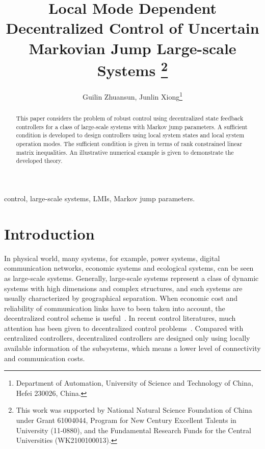 \documentclass[11pt,draftcls,onecolumn]{IEEEtran}
\begin{document}
\title{Local Mode Dependent Decentralized  Control of Uncertain Markovian Jump Large-scale Systems \thanks{This work was supported by National Natural Science Foundation
    of China under Grant 61004044, Program for New Century Excellent Talents
    in University (11-0880), and the Fundamental Research Funds for the
    Central Universities (WK2100100013).}
}
\author{Guilin Zhuansun, Junlin Xiong\thanks{Department of Automation, University of Science and Technology of
    China, Hefei 230026, China.}}



\maketitle

\begin{abstract}
This paper considers the problem of robust   control using decentralized state feedback controllers for a class of  large-scale systems with Markov jump parameters.  A  sufficient condition is developed to design   controllers using local system states and local system operation modes. The sufficient condition is given in terms of rank constrained linear matrix inequalities. An illustrative numerical example is given to demonstrate the developed theory.
\end{abstract}
\begin{IEEEkeywords}
 control, large-scale systems, LMIs, Markov jump parameters.
\end{IEEEkeywords}

\section{Introduction}
In physical world, many systems, for example, power systems, digital communication networks, economic systems and ecological systems, can be seen as large-scale systems. Generally, large-scale systems represent a class of
dynamic systems with high dimensions and complex structures, and such systems are usually  characterized by geographical separation. When economic cost and reliability of  communication links have to been taken into account,
the decentralized control scheme is useful~\cite{Sandell1978}. In recent control literatures, much attention has been given to decentralized control problems~\cite{Ugrinovskii2005,Xiong2009,Ugrinovskii2000}. Compared with centralized controllers, decentralized controllers are designed only using locally available information of the subsystems, which means a lower level of connectivity and  communication costs.
\end{document}
